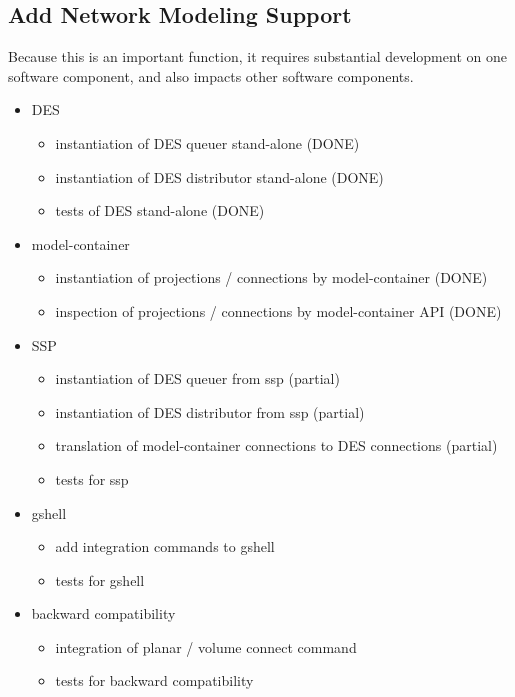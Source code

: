 \documentclass[12pt]{article}
\begin{document}
\subsection{Add Network Modeling Support}

Because this is an important function, it requires substantial
development on one software component, and also impacts other software
components.

\begin{itemize}
\item DES
  \begin{itemize}
  \item instantiation of DES queuer stand-alone (DONE)
  \item instantiation of DES distributor stand-alone (DONE)
  \item tests of DES stand-alone (DONE)
  \end{itemize}
\item model-container
  \begin{itemize}
  \item instantiation of projections / connections by model-container (DONE)
  \item inspection of projections / connections by model-container API (DONE)
  \end{itemize}
\item SSP
  \begin{itemize}
  \item instantiation of DES queuer from ssp (partial)
  \item instantiation of DES distributor from ssp (partial)
  \item translation of model-container connections to DES connections (partial)
  \item tests for ssp
  \end{itemize}
\item gshell
  \begin{itemize}
  \item add integration commands to gshell
  \item tests for gshell
  \end{itemize}
\item backward compatibility
  \begin{itemize}
  \item integration of planar / volume connect command
  \item tests for backward compatibility
  \end{itemize}
\end{itemize}
\end{document}
